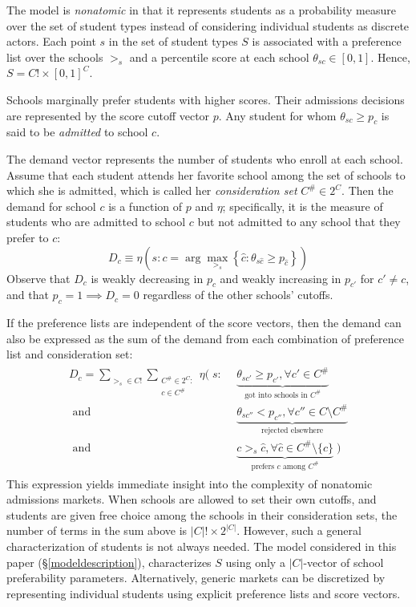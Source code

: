 \documentclass[12pt]{article}
\theoremstyle{definition}
\begin{document}
The model is \emph{nonatomic} in that it represents students as a probability measure over the set of student types instead of considering individual students as discrete actors. Each point $s$ in the set of student types $S$ is associated with a preference list over the schools $>_s$ and a percentile score at each school $\theta_{sc} \in [0,1]$. Hence, $S = C! \times [0, 1]^C$. 

Schools marginally prefer students with higher scores. Their admissions decisions are represented by the score cutoff vector $p$. Any student for whom $\theta_{sc} \geq p_c$ is said to be \emph{admitted} to school $c$. 

The demand vector represents the number of students who enroll at each school. Assume that each student attends her favorite school among the set of schools to which she is admitted, which is called her \emph{consideration set} $C^\# \in 2^C$. Then the demand for school $c$ is a function of $p$ and $\eta$; specifically, it is the measure of students who are admitted to school $c$ but not admitted to any school that they prefer to $c$:
\begin{equation} \label{demanddefinition}
D_c \equiv \eta\left(s: c = \arg \max_{>_s} \left\{\hat c: \theta_{s\hat c} \geq p_{\hat c} \right\}\right)
\end{equation}
Observe that $D_c$ is weakly decreasing in $p_c$ and weakly increasing in $p_{c'}$ for $c' \neq c$, and that $p_c = 1 \implies D_c = 0$ regardless of the other schools' cutoffs.

If the preference lists are independent of the score vectors, then the demand can also be expressed as the sum of the demand from each combination of preference list and consideration set:
\begin{gather} \label{demandbigsum}
\begin{aligned}
D_c = 
\sum_{>_s \in C!} \sum_{\substack{C^\# \in 2^{C}:\\ c \in C^\#}}
\eta\Big(\;s:&~~\underbrace{\theta_{sc'} \geq p_{c'}, \forall c' \in C^\#}_{\text{got into schools in } C^\# } \\
\text{ and} &~~\underbrace{\theta_{sc''} < p_{c''}, \forall c'' \in C \setminus C^\#}_{\text{rejected elsewhere}} \\
\text{ and} &~~\underbrace{c >_s \hat c, \forall \hat c \in C^\#\setminus \{c\}}_{\text{prefers } c \text{ among } C^\#} \;\Big)
\end{aligned}
\end{gather}
This expression yields immediate insight into the complexity of nonatomic admissions markets. When schools are allowed to set their own cutoffs, and students are given free choice among the schools in their consideration sets, the number of terms in the sum above is $|C|!\times2^{|C|}$. However, such a general characterization of students is not always needed. The model considered in this paper (\S\ref{modeldescription}), characterizes $S$ using only a $|C|$-vector of school preferability parameters. Alternatively, generic markets can be discretized by representing individual students using explicit preference lists and score vectors. 
\end{document}
